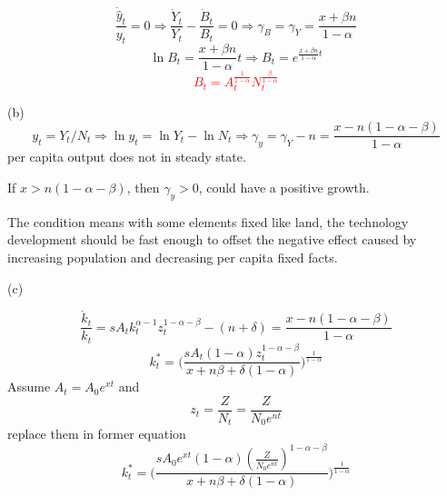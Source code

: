 \documentclass[letterpaper, 11pt]{article}
\newcommand{\1}{\mathds{1}}	%
\theoremstyle{definition}
\begin{document}
\[
  \frac{\dot{\hat{y}}_t}{y_t} = 0 \Longrightarrow  \frac{\dot{Y}_t}{Y_t} - \frac{\dot{B}_t}{B_t} = 0 \Longrightarrow \gamma_B = \gamma_Y = \frac{x + \beta n}{1-\alpha}
\]
\[
  \ln B_t = \frac{x + \beta n}{1-\alpha} t \Longrightarrow B_t = e^{\frac{x + \beta n}{1-\alpha}t}
\]
\textcolor{red}{
\[
    B_t = A_t^{\frac{1}{1-\alpha}}N_t^{\frac{\beta}{1-\alpha}}
\]
}


(b)
\[
  y_t = Y_t/N_t \Longrightarrow \ln y_t = \ln Y_t - \ln N_t \Longrightarrow \gamma_y = \gamma_Y - n = \frac{x - n(1-\alpha-\beta)}{1-\alpha}
\]
per capita output does not in steady state.

If $x > n(1-\alpha-\beta)$, then $\gamma_y > 0$, could have a positive growth.

The condition means with some elements fixed like land, the technology development should be fast enough to offset the negative effect caused by increasing population and decreasing per capita fixed facts.


(c)

\[
  \frac{\dot{k}_t}{k_t} =s A_t k_t^{\alpha-1}z_t^{1-\alpha-\beta} - (n+\delta) = \frac{x - n(1-\alpha-\beta)}{1-\alpha}
\]
\[
  k^*_t = \Big(\frac{sA_t(1-\alpha)z_t^{1-\alpha-\beta}}{x + n \beta + \delta(1-\alpha)}\Big)^{\frac{1}{1-\alpha}}
\]
Assume $A_t = A_0 e^{xt}$ and \[
  z_t = \frac{Z}{N_t} = \frac{Z}{N_0e^{nt}}
\] replace them in former equation \[
  k^*_t = \Big(\frac{sA_0 e^{xt}(1-\alpha){(\frac{Z}{N_0e^{nt}})}^{1-\alpha-\beta}}{x + n \beta + \delta(1-\alpha)}\Big)^{\frac{1}{1-\alpha}}
\]


\end{document}
